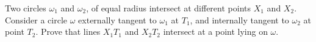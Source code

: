 Two circles $\omega_1$ and $\omega_2$, of equal radius intersect at different points $X_1$ and $X_2$. Consider a circle $\omega$ externally tangent to $\omega_1$ at $T_1$, and internally tangent to $\omega_2$ at point $T_2$. Prove that lines $X_1T_1$ and $X_2T_2$ intersect at a point lying on $\omega$.